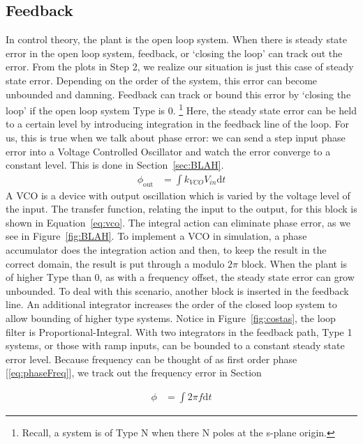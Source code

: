 \documentclass[]{article}
\begin{document}
\subsection{Feedback}
In control theory, the plant is the open loop system.  When there is steady state error in the open loop system, feedback, or `closing the loop' can track out the error.  From the plots in Step 2, we realize our situation is just this case of steady state error.  Depending on the order of the system, this error can become unbounded and damning.  Feedback can track or bound this error by `closing the loop' if the open loop system Type is 0.  \footnote{Recall, a system is of Type N when there N poles at the s-plane origin.}  Here, the steady state error can be held to a certain level by introducing integration in the feedback line of the loop.  For us, this is true when we talk about phase error: we can send a step input phase error into a Voltage Controlled Oscillator and watch the error converge to a constant level.  This is done in Section~\ref{sec:BLAH}. 
\begin{align}
\label{eq:vco}
\phi_{\text{out}} &= \int \! k_{VCO}V_{in} \mathrm{d}t
\end{align}
A VCO is a device with output oscillation which is varied by the voltage level of the input.  The transfer function, relating the input to the output, for this block is shown in Equation~\ref{eq:vco}. The integral action can eliminate phase error, as we see in Figure~\ref{fig:BLAH}.  To implement a VCO in simulation, a phase accumulator does the integration   action and then, to keep the result in the correct domain, the result is put through a modulo $2\pi$ block.   
When the plant is of higher Type than 0, as with a frequency offset, the steady state error can grow unbounded.  To deal with this scenario, another block is inserted in the feedback line.  An additional integrator increases the order of the closed loop system to allow bounding of higher type systems.  Notice in Figure~\ref{fig:costas}, the loop filter is Proportional-Integral.  With two integrators in the feedback path, Type 1 systems, or those with ramp inputs, can be bounded to a constant steady state error level.  Because frequency can be thought of as first order phase [\ref{eq:phaseFreq}], we track out the frequency error in Section

\begin{align}
\label{eq:phaseFreq}
\phi &= \int \! 2\pi f \mathrm{d}t 
\end{align}


\newpage
\end{document}
